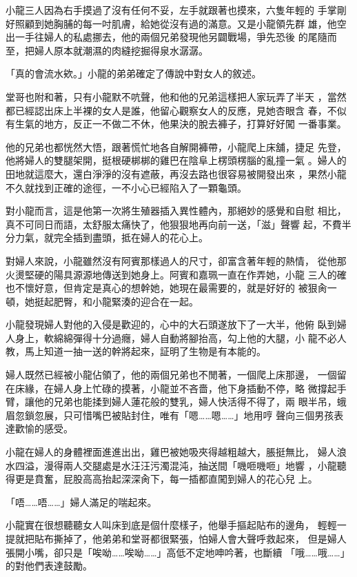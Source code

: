 小龍三人因為右手摸過了沒有任何不妥，左手就跟著也摸來，六隻年輕的
手掌剛好照顧到她胸脯的每一吋肌膚，給她從沒有過的滿意。又是小龍領先群
雄，他空出一手往婦人的私處挪去，他的兩個兄弟發現他另闢戰場，爭先恐後
的尾隨而至，把婦人原本就潮濕的肉縫挖掘得泉水潺潺。

「真的會流水欸。」小龍的弟弟確定了傳說中對女人的敘述。

堂哥也附和著，只有小龍默不吭聲，他和他的兄弟這樣把人家玩弄了半天
，當然都已經認出床上半裸的女人是誰，他留心觀察女人的反應，見她杏眼含
春，不似有生氣的地方，反正一不做二不休，他果決的脫去褲子，打算好好闖
一番事業。

他的兄弟也都恍然大悟，跟著慌忙地各自解開褲帶，小龍爬上床舖，捷足
先登，他將婦人的雙腿架開，挺根硬梆梆的雞巴在陰阜上楞頭楞腦的亂撞一氣
。婦人的田地就這麼大，還白淨淨的沒有遮蔽，再沒去路也很容易被開發出來
，果然小龍不久就找到正確的途徑，一不小心已經陷入了一顆龜頭。

對小龍而言，這是他第一次將生殖器插入異性體內，那絕妙的感覺和自慰
相比，真不可同日而語，太舒服太痛快了，他狠狠地再向前一送，「滋」聲響
起，不費半分力氣，就完全插到盡頭，抵在婦人的花心上。

對婦人來說，小龍雖然沒有阿賓那樣過人的尺寸，卻富含著年輕的熱情，
從他那火燙堅硬的陽具源源地傳送到她身上。阿賓和嘉珮一直在作弄她，小龍
三人的確也不懷好意，但肯定是真心的想幹她，她現在最需要的，就是好好的
被狠肏一頓，她挺起肥臀，和小龍緊湊的迎合在一起。

小龍發現婦人對他的入侵是歡迎的，心中的大石頭遂放下了一大半，他俯
臥到婦人身上，軟綿綿彈得十分過癮，婦人自動將腳抬高，勾上他的大腿，小
龍不必人教，馬上知道一抽一送的幹將起來，証明了生物是有本能的。

婦人既然已經被小龍佔領了，他的兩個兄弟也不閒著，一個爬上床那邊，
一個留在床緣，在婦人身上忙碌的摸著，小龍並不吝嗇，他下身插動不停，略
微撐起手臂，讓他的兄弟也能揉到婦人蓮花般的雙乳，婦人快活得不得了，兩
眼半吊，蛾眉忽鎖忽展，只可惜嘴巴被貼封住，唯有「嗯……嗯……」地用哼
聲向三個男孩表達歡愉的感受。

小龍在婦人的身體裡面進進出出，雞巴被她吸夾得越粗越大，脹挺無比，
婦人浪水四溢，漫得兩人交腿處是水汪汪污濁混沌，抽送間「嘰咂嘰咂」地響
，小龍聽得更是賁奮，屁股高高抬起深深肏下，每一插都直闖到婦人的花心兒
上。

「唔……唔……」婦人滿足的喘起來。

小龍實在很想聽聽女人叫床到底是個什麼樣子，他舉手摳起貼布的邊角，
輕輕一提就把貼布撕掉了，他弟弟和堂哥都很緊張，怕婦人會大聲呼救起來，
但是婦人張開小嘴，卻只是「唉呦……唉呦……」高低不定地呻吟著，也斷續
「哦……哦……」的對他們表達鼓勵。

